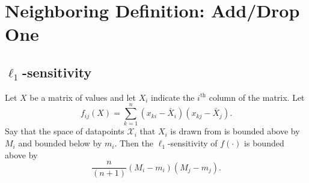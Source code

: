 \documentclass[11pt]{scrartcl} %
\begin{document}
\section{Neighboring Definition: Add/Drop One}
\subsection{$\ell_1$-sensitivity}

\begin{theorem}
Let $X$ be a matrix of values and let $X_i$ indicate the $i^{\text{th}}$ column of the matrix. Let
$$ f_{ij} (X)= \sum_{k=1}^n (x_{ki} - \bar{X}_i)(x_{kj} - \bar{X}_j).$$
Say that the space of datapoints $\mathcal{X}_i$ that $X_i$ is drawn from is bounded above by $M_i$ and bounded below by $m_i$. Then the $\ell_1$-sensitivity of $f(\cdot)$ is bounded above by
 $$ \frac{n}{(n+1)}  (M_i - m_i)(M_j - m_j).$$ 
\end{theorem}
\end{document}

